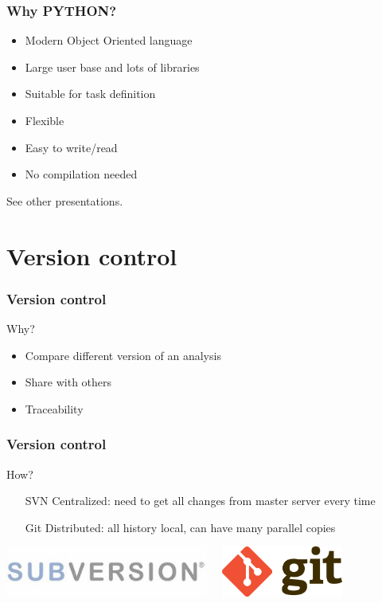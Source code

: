 \documentclass[14pt]{beamer}
\begin{document}
\begin{frame}
\frametitle{Why PYTHON?}
\begin{itemize}
\item Modern Object Oriented language
\item Large user base and lots of libraries
\item Suitable for task definition
\item Flexible
\item Easy to write/read
\item No compilation needed
\end{itemize}
See other presentations.
\end{frame}

\section{Version control}
\begin{frame}
\frametitle{Version control}
\begin{block}{Why?}
\begin{itemize}
\item Compare different version of an analysis
\item Share with others
\item Traceability
\end{itemize}
\end{block}
\end{frame}
\begin{frame}
\frametitle{Version control}
\begin{block}{How?}
\begin{itemize}
\item[SVN] Centralized: need to get all changes from master server every time
\item[\alert{Git}] Distributed: all history local, can have many parallel copies
\end{itemize}
\includegraphics[width=0.5\textwidth]{svn-name-banner.jpg}$\quad$
\includegraphics[width=0.3\textwidth]{Git-Logo-2Color.png}
\end{block}
\end{frame}
\end{document}
